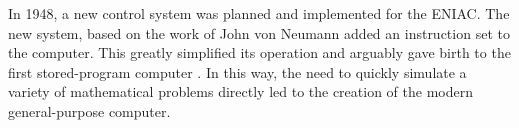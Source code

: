\documentclass[../main.tex]{subfiles}
\begin{document}
In 1948, a new control system was planned and implemented for the ENIAC.
The new system, based on the work of John von Neumann \cite{VonNeumann1993} \cite{Haigh2014a} added an instruction set to the computer.
This greatly simplified its operation and arguably gave birth to the first stored-program computer \cite{Rope2007}.
In this way, the need to quickly simulate a variety of mathematical problems directly led to the creation of the modern general-purpose computer.
\end{document}
